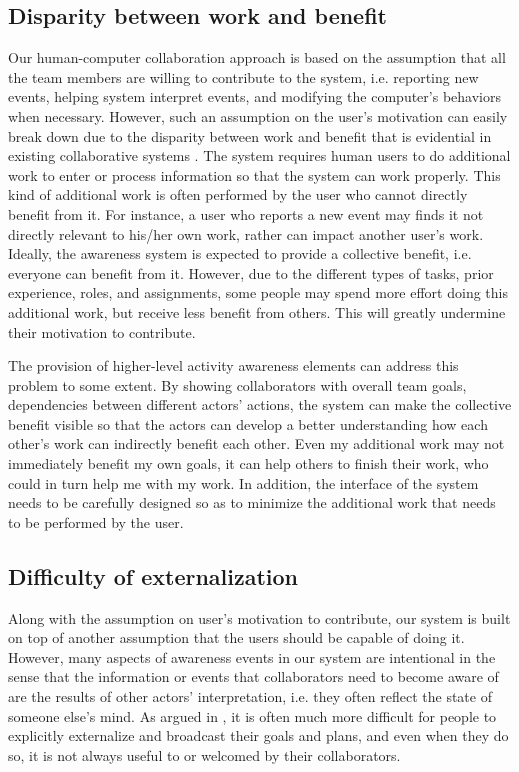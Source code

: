 \subsection{Disparity between work and benefit} %
\label{sub:disparity_between_work_and_benefit}
 Our human-computer collaboration approach is based on the assumption that all the team members are willing to contribute to the system, i.e. reporting new events, helping system interpret events, and modifying the computer's behaviors when necessary. However, such an assumption on the user's motivation can easily break down due to the disparity between work and benefit that is evidential in existing collaborative systems \cite{Grudin1994}. The system requires human users to do additional work to enter or process information so that the system can work properly. This kind of additional work is often performed by the user who cannot directly benefit from it. For instance, a user who reports a new event may finds it not directly relevant to his/her own work, rather can impact another user's work. Ideally, the awareness system is expected to provide a collective benefit, i.e. everyone can benefit from it. However, due to the different types of tasks, prior experience, roles, and assignments, some people may spend more effort doing this additional work, but receive less benefit from others. This will greatly undermine their motivation to contribute. 

 The provision of higher-level activity awareness elements can address this problem to some extent. By showing collaborators with overall team goals, dependencies between different actors' actions, the system can make the collective benefit visible so that the actors can develop a better understanding how each other's work can indirectly benefit each other. Even my additional work may not immediately benefit my own goals, it can help others to finish their work, who could in turn help me with my work. In addition, the interface of the system needs to be carefully designed so as to minimize the additional work that needs to be performed by the user.    

\subsection{Difficulty of externalization } %
\label{sub:difficulty_of_externalization_}
Along with the assumption on user's motivation to contribute, our system is built on top of another assumption that the users should be capable of doing it. However, many aspects of awareness events in our system are intentional in the sense that the information or events that collaborators need to become aware of are the results of other actors' interpretation, i.e. they often reflect the state of someone else's mind. As argued in \cite{carroll2003a}, it is often much more difficult for people to explicitly externalize and broadcast their goals and plans, and even when they do so, it is not always useful to or welcomed by their collaborators.

